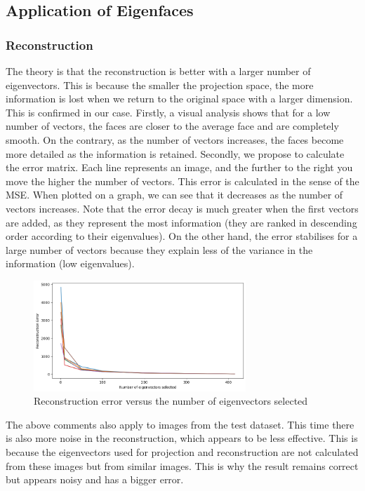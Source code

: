 \subsection{Application of Eigenfaces}

\subsubsection{Reconstruction}

The theory is that the reconstruction is better with a larger number of eigenvectors. This is because the smaller the projection space, the more information is lost when we return to the original space with a larger dimension. This is confirmed in our case. Firstly, a visual analysis shows that for a low number of vectors, the faces are closer to the average face and are completely smooth. On the contrary, as the number of vectors increases, the faces become more detailed as the information is retained. Secondly, we propose to calculate the error matrix. Each line represents an image, and the further to the right you move the higher the number of vectors. This error is calculated in the sense of the MSE. When plotted on a graph, we can see that it decreases as the number of vectors increases. Note that the error decay is much greater when the first vectors are added, as they represent the most information (they are ranked in descending order according to their eigenvalues). On the other hand, the error stabilises for a large number of vectors because they explain less of the variance in the information (low eigenvalues).

\begin{figure}[h]
	\centering
	\includegraphics[width=8.0cm]{./Ressources/Reconstruction_error.png}
	\vspace{-3mm}
	\caption{Reconstruction error versus the number of eigenvectors selected}
	\label{fig:rect_result}
\end{figure}

The above comments also apply to images from the test dataset. This time there is also more noise in the reconstruction, which appears to be less effective. This is because the eigenvectors used for projection and reconstruction are not calculated from these images but from similar images. This is why the result remains correct but appears noisy and has a bigger error.

